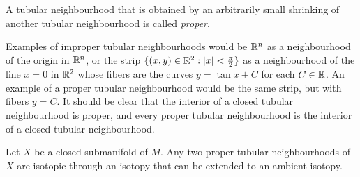 \begin{defn}
	A tubular neighbourhood that is obtained by an arbitrarily small shrinking of another tubular neighbourhood is called \emph{proper}.
\end{defn}

Examples of improper tubular neighbourhoods would be $\mathbb{R}^n$ as a neighbourhood of the origin in $\mathbb{R}^n$, or the strip $\{ (x,y)\in \mathbb{R}^2 : |x|< \frac{\pi}{2}\}$ as a neighbourhood of the line $x=0$ in $\mathbb{R}^2$ whose fibers are the curves $y=\tan x + C$ for each $C\in\mathbb{R}$.
An example of a proper tubular neighbourhood would be the same strip, but with fibers $y=C$.
It should be clear that the interior of a closed tubular neighbourhood is proper, and every proper tubular neighbourhood is the interior of a closed tubular neighbourhood.

\begin{theorem}
	Let $X$ be a closed submanifold of $M$.
	Any two proper tubular neighbourhoods of $X$ are isotopic through an isotopy that can be extended to an ambient isotopy.
\end{theorem}





